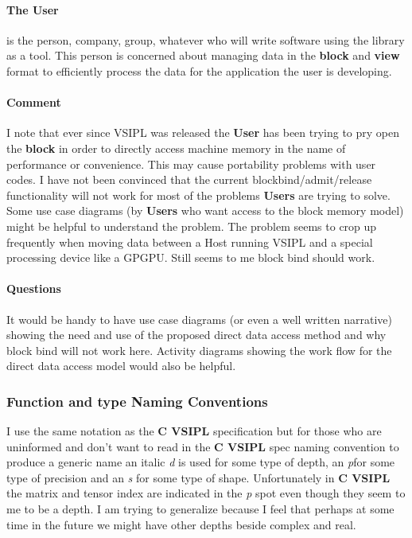 \documentclass[11pt, oneside]{article}
\newcommand{\cvl}{\ttbf{C VSIPL}}
\newcommand{\ttbf}[1]{{\ttfamily \bfseries #1}}
\newcommand{\blk}{\ttbf{block}}
\newcommand{\vw}{\ttbf{view}}
\begin{document}
\paragraph{The \ttbf{User}}is the person, company, group, whatever who will write software using the library as a tool. This person is concerned about managing data in the \blk{} and \vw{} format to efficiently process the data for the application the user is developing.
\paragraph{Comment}I note that ever since VSIPL was released the \ttbf{User} has been trying to pry open the \blk{} in order to directly access machine memory in the name of performance or convenience.  This may cause portability problems with user codes. I have not been convinced that the current blockbind/admit/release functionality will not work for most of the problems \ttbf{Users} are trying to solve.  Some use case diagrams (by \ttbf{Users} who want access to the block memory model) might be helpful to understand the problem. The problem seems to crop up frequently when moving data between a Host running VSIPL and a special processing device like a GPGPU. Still seems to me block bind should work.
\paragraph{Questions}It would be handy to have use case diagrams (or even a well written narrative) showing the need and use of the proposed direct data access method and why block bind will not work here.  Activity diagrams showing the work flow for the direct data access model would also be helpful.
\subsubsection{Function and type Naming Conventions}
I use the same notation as the \cvl{} specification but for those who are uninformed and don't want to read in the \cvl{} spec naming convention to produce a generic name an italic \emph{d} is used for some type of depth, an \emph{p}for some type of precision and an \emph{s} for some type of shape. Unfortunately in \cvl{} the matrix and tensor index are indicated in the \emph{p} spot even though they seem to me to be a depth. I am trying to generalize because I feel that perhaps at some time in the future we might have other depths beside complex and real.
\end{document}
